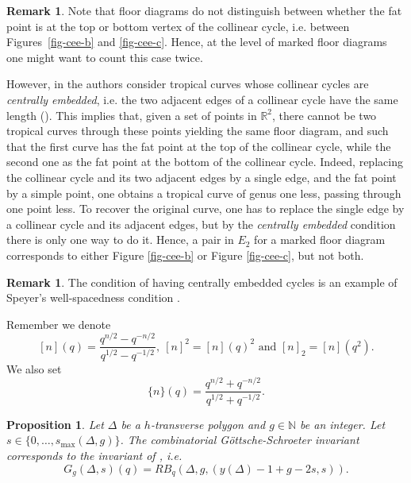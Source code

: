 \documentclass[11pt]{article}
\newtheorem{prop}[theo]{Proposition}
\theoremstyle{definition}
\newtheorem{rema}[theo]{Remark}
\numberwithin{equation}{section}
\newcommand{\R}{\mathbb{R}}
\newcommand{\N}{\mathbb{N}}
\newcommand{\smax}{s_{\max}}
\theoremstyle{plain}
\begin{document}
\begin{rema}\label{rk-doublecount}
Note that floor diagrams do not distinguish between whether the fat point is at the top or bottom vertex of the collinear cycle, i.e.  between Figures~\ref{fig-cee-b} and \ref{fig-cee-c}. Hence, at the level of marked floor diagrams one might want to count this case twice.

 However, in \cite{shustin-2024-refined} the authors consider tropical curves whose collinear cycles are \emph{centrally embedded}, i.e.  the two adjacent edges of a collinear cycle have the same length (\cite[Lemma~4.6]{shustin-2024-refined}). This implies that, given a set of points in $\R^2$, there cannot be two tropical curves through these points yielding the same floor diagram, and such that the first curve has the fat point at the top of the collinear cycle, while the second one as the fat point at the bottom of the collinear cycle.
 Indeed, replacing the collinear cycle and its two adjacent edges by a single edge, and the fat point by a simple point, one obtains a tropical curve of genus one less, passing through one point less. To recover the original curve, one has to replace the single edge by a collinear cycle and its adjacent edges, but by the \emph{centrally embedded} condition there is only one way to do it. 
 Hence, a pair in $E_2$ for a marked floor diagram corresponds to either Figure \ref{fig-cee-b} or Figure \ref{fig-cee-c}, but not both.
\end{rema}

\begin{rema}
The condition of having centrally embedded cycles is an example of Speyer's well-spacedness condition \cite{speyer-2014-parametrizing}.
\end{rema}



Remember we denote 
\[ [n](q) = \dfrac{q^{n/2}-q^{-n/2}}{q^{1/2}-q^{-1/2}},\ [n]^2 = [n](q)^2 \text{ and } [n]_2 = [n](q^2). \]
We also set
\[ \{n\}(q) = \dfrac{q^{n/2}+q^{-n/2}}{q^{1/2}+q^{-1/2}} . \]




\begin{prop}\label{prop-equal-shustin}
Let $\Delta$ be a $h$-transverse polygon and $g\in\N$ be an integer. Let $s\in \{0,\dots,\smax(\Delta,g)\}$. The combinatorial Göttsche-Schroeter invariant corresponds to the invariant of \cite{shustin-2024-refined}, i.e. 
\[ G_g(\Delta,s)(q) = RB_q(\Delta,g,(y(\Delta)-1+g-2s,s)) . \]
\end{prop}
\end{document}

